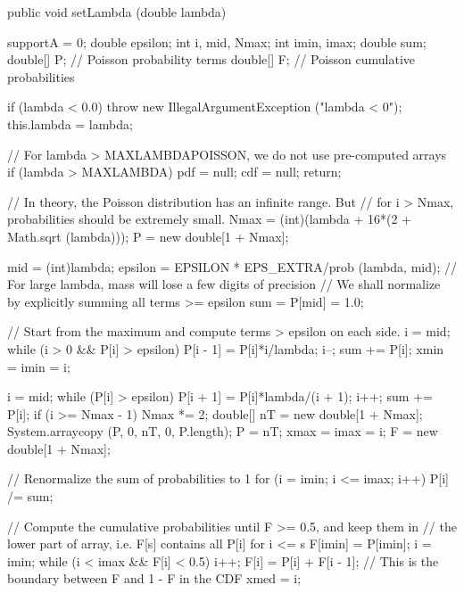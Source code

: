 \begin{code}

   public void setLambda (double lambda)\begin{hide} {
      supportA = 0;
      double epsilon;
      int i, mid, Nmax;
      int imin, imax;
      double sum;
      double[] P;    // Poisson probability terms
      double[] F;    // Poisson cumulative probabilities

      if (lambda < 0.0)
         throw new IllegalArgumentException ("lambda < 0");
      this.lambda = lambda;

      // For lambda > MAXLAMBDAPOISSON, we do not use pre-computed arrays
      if (lambda > MAXLAMBDA) {
         pdf = null;
         cdf = null;
         return;
      }

      // In theory, the Poisson distribution has an infinite range. But
      // for i > Nmax, probabilities should be extremely small.
      Nmax = (int)(lambda + 16*(2 + Math.sqrt (lambda)));
      P = new double[1 + Nmax];

      mid = (int)lambda;
      epsilon = EPSILON * EPS_EXTRA/prob (lambda, mid);
      // For large lambda, mass will lose a few digits of precision
      // We shall normalize by explicitly summing all terms >= epsilon
      sum = P[mid] = 1.0;

      // Start from the maximum and compute terms > epsilon on each side.
      i = mid;
      while (i > 0 && P[i] > epsilon) {
         P[i - 1] = P[i]*i/lambda;
         i--;
         sum += P[i];
      }
      xmin = imin = i;

      i = mid;
      while (P[i] > epsilon) {
         P[i + 1] = P[i]*lambda/(i + 1);
         i++;
         sum += P[i];
         if (i >= Nmax - 1) {
            Nmax *= 2;
            double[] nT = new double[1 + Nmax];
            System.arraycopy (P, 0, nT, 0, P.length);
            P = nT;
         }
      }
      xmax = imax = i;
      F = new double[1 + Nmax];

      // Renormalize the sum of probabilities to 1
      for (i = imin; i <= imax; i++)
         P[i] /= sum;

      // Compute the cumulative probabilities until F >= 0.5, and keep them in
      // the lower part of array, i.e. F[s] contains all P[i] for i <= s
      F[imin] = P[imin];
      i = imin;
      while (i < imax && F[i] < 0.5) {
         i++;
         F[i] = P[i] + F[i - 1];
      }
      // This is the boundary between F and 1 - F in the CDF
      xmed = i;

}
\end{hide}
\end{code}
